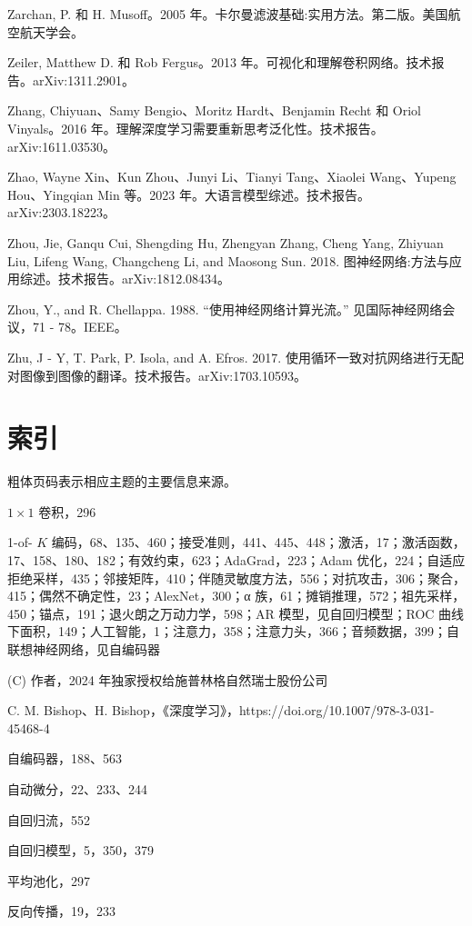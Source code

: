 \documentclass[10pt]{article}
\begin{document}
Zarchan, P. 和 H. Musoff。2005 年。卡尔曼滤波基础:实用方法。第二版。美国航空航天学会。

Zeiler, Matthew D. 和 Rob Fergus。2013 年。可视化和理解卷积网络。技术报告。arXiv:1311.2901。

Zhang, Chiyuan、Samy Bengio、Moritz Hardt、Benjamin Recht 和 Oriol Vinyals。2016 年。理解深度学习需要重新思考泛化性。技术报告。arXiv:1611.03530。

Zhao, Wayne Xin、Kun Zhou、Junyi Li、Tianyi Tang、Xiaolei Wang、Yupeng Hou、Yingqian Min 等。2023 年。大语言模型综述。技术报告。arXiv:2303.18223。

Zhou, Jie, Ganqu Cui, Shengding Hu, Zhengyan Zhang, Cheng Yang, Zhiyuan Liu, Lifeng Wang, Changcheng Li, and Maosong Sun. 2018. 图神经网络:方法与应用综述。技术报告。arXiv:1812.08434。

Zhou, Y., and R. Chellappa. 1988. “使用神经网络计算光流。” 见国际神经网络会议，71 - 78。IEEE。

Zhu, J - Y, T. Park, P. Isola, and A. Efros. 2017. 使用循环一致对抗网络进行无配对图像到图像的翻译。技术报告。arXiv:1703.10593。

\section*{索引}

粗体页码表示相应主题的主要信息来源。

\(1 \times  1\) 卷积，296

1-of- \(K\) 编码，68、135、460；接受准则，441、445、448；激活，17；激活函数，17、158、180、182；有效约束，623；AdaGrad，223；Adam 优化，224；自适应拒绝采样，435；邻接矩阵，410；伴随灵敏度方法，556；对抗攻击，306；聚合，415；偶然不确定性，23；AlexNet，300；α 族，61；摊销推理，572；祖先采样，450；锚点，191；退火朗之万动力学，598；AR 模型，见自回归模型；ROC 曲线下面积，149；人工智能，1；注意力，358；注意力头，366；音频数据，399；自联想神经网络，见自编码器

(C) 作者，2024 年独家授权给施普林格自然瑞士股份公司

C. M. Bishop、H. Bishop，《深度学习》，https://doi.org/10.1007/978-3-031-45468-4

自编码器，188、563

自动微分，22、233、244

自回归流，552

自回归模型，5，350，379

平均池化，297

反向传播，19，233
\end{document}
